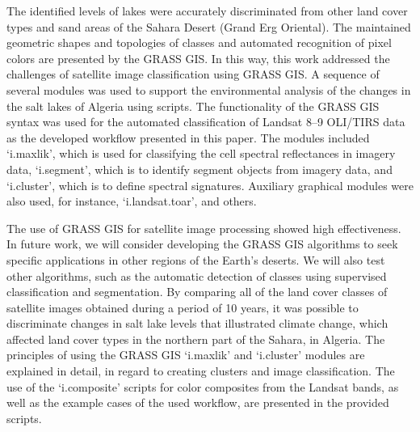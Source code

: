 \documentclass[asi,article,accept,pdftex,moreauthors]{Definitions/mdpi}
\begin{document}
{The} identified levels of lakes were accurately discriminated from other land cover types and sand areas of the Sahara Desert (Grand Erg Oriental). {The }maintained geometric shapes and topologies of classes and automated recognition of pixel colors are presented by the GRASS GIS. {In this way, this} work addressed the challenges of  satellite {image classification} using GRASS GIS{. A sequence of several modules was used to }support the environmental analysis of the {changes in the }salt lakes {of Algeria} using {scripts}. The functionality of the GRASS GIS syntax was used for the automated {classification} of Landsat 8--9 OLI/TIRS data {as the developed workflow presented in this paper}. The {modules included }`i.maxlik', which is {used for} classifying the cell spectral reflectances in imagery data, `i.segment', which is to identify segment objects from imagery data, and `i.cluster',  which is to define spectral {signatures}. Auxiliary graphical modules were also used, {for instance, }`i.landsat.toar', and others. 

The use of GRASS GIS for satellite image processing {showed }high effectiveness{. In}  future work, we will consider developing the GRASS GIS algorithms to seek specific applications in other regions of the Earth's deserts. We will also test other algorithms, such as the automatic detection of classes using supervised classification {and segmentation}. By comparing all of the land cover classes of satellite images obtained during a period of 10 years, it was possible to discriminate changes in salt lake levels that illustrated climate change,{ which affected land cover types }in the northern part of the Sahara{, in Algeria}. The principles of using the GRASS GIS  `i.maxlik' and `i.cluster' modules {are explained in detail, in regard to }creating clusters and image classification{. The} use of the `i.composite' scripts for color composites from the Landsat bands, as well as the example cases of the used workflow, are presented in the {provided }scripts. 

\vspace{6pt}
\end{document}
